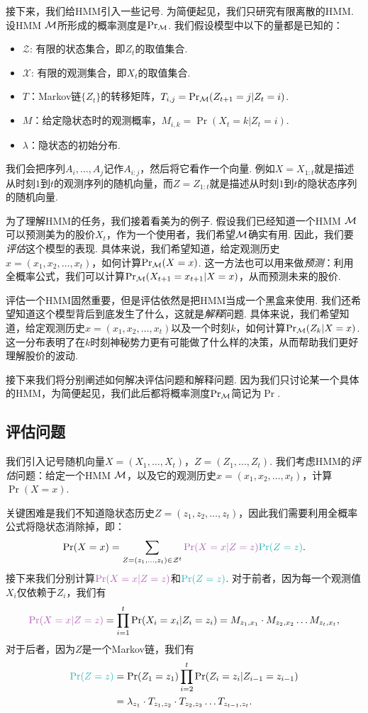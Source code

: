 接下来，我们给HMM引入一些记号. 为简便起见，我们只研究有限离散的HMM. 设HMM $\mathcal M$所形成的概率测度是$\Pr_\mathcal M$. 我们假设模型中以下的量都是已知的：
\begin{itemize}
    \item $\mathcal Z$: 有限的状态集合，即$Z_t$的取值集合.
    \item $\mathcal X$: 有限的观测集合，即$X_t$的取值集合.
    \item $T$：Markov链$\{Z_t\}$的转移矩阵，$T_{i,j}=\Pr_\mathcal M(Z_{t+1}=j|Z_t=i)$.
    \item $M$：给定隐状态时的观测概率，$M_{i,k} = \Pr(X_t=k|Z_t=i)$.
    \item $\lambda$：隐状态的初始分布.
\end{itemize}

我们会把序列$A_i,\dots, A_j$记作$A_{i:j}$，然后将它看作一个向量. 例如$X=X_{1:t}$就是描述从时刻$1$到$t$的观测序列的随机向量，而$Z=Z_{1:t}$就是描述从时刻$1$到$t$的隐状态序列的随机向量.

为了理解HMM的任务，我们接着看美为的例子. 假设我们已经知道一个HMM $\mathcal M$可以预测美为的股价$X_t$，作为一个使用者，我们希望$\mathcal M$确实有用. 因此，我们要\emph{评估}这个模型的表现. 具体来说，我们希望知道，给定观测历史$x=(x_1,x_2,\dots,x_t)$，如何计算$\Pr_\mathcal M(X=x)$. 这一方法也可以用来做\emph{预测}：利用全概率公式，我们可以计算$\Pr_\mathcal M(X_{t+1}=x_{t+1}|X=x)$，从而预测未来的股价.

评估一个HMM固然重要，但是评估依然是把HMM当成一个黑盒来使用. 我们还希望知道这个模型背后到底发生了什么，这就是\emph{解释}问题. 具体来说，我们希望知道，给定观测历史$x=(x_1,x_2,\dots,x_t)$以及一个时刻$k$，如何计算$\Pr_\mathcal M(Z_k|X=x)$. 这一分布表明了在$k$时刻神秘势力更有可能做了什么样的决策，从而帮助我们更好理解股价的波动.

接下来我们将分别阐述如何解决评估问题和解释问题. 因为我们只讨论某一个具体的HMM，为简便起见，我们此后都将概率测度$\Pr_\mathcal M$简记为$\Pr$.

\subsection{评估问题}

我们引入记号随机向量$X=(X_1,\dots,X_t)$，$Z=(Z_1,\dots,Z_t)$. 我们考虑HMM的\emph{评估}问题：给定一个HMM $\mathcal M$，以及它的观测历史$x=(x_1,x_2,\dots,x_t)$，计算$\Pr(X=x)$. 

关键困难是我们不知道隐状态历史$Z=(z_1,z_2,\dots,z_t)$，因此我们需要利用全概率公式将隐状态消除掉，即：
\[
    \Pr(X=x) =\sum_{Z=(z_1, \dots, z_t) \in \mathcal Z^t} \light{\Pr(X=x|Z=z)}\contrastlight{\Pr(Z=z)}.
\]
接下来我们分别计算$\light{\Pr(X=x|Z=z)}$和$\contrastlight{\Pr(Z=z)}$. 对于前者，因为每一个观测值$X_i$仅依赖于$Z_i$，我们有
\[
    \light{\Pr(X=x|Z=z)} = \prod_{i=1}^t \Pr(X_i = x_i| Z_i = z_i) = M_{z_1,x_1}\cdot M_{z_2,x_2}\dots M_{z_t,x_t},
\]
对于后者，因为$Z$是一个Markov链，我们有
\begin{align*}
    \contrastlight{\Pr(Z=z)} &= \Pr(Z_1 = z_1) \prod_{i=2}^t\Pr(Z_i = z_i| Z_{i-1} = z_{i-1}) 
    \\
    &= \lambda_{z_1}\cdot T_{z_1,z_2}\cdot T_{z_2,z_3}\dots T_{z_{t-1},z_t}.
\end{align*}

